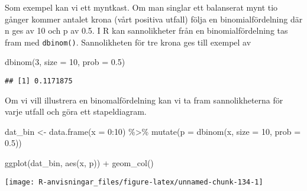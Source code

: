 \documentclass[
]{book}
\newenvironment{Shaded}{\begin{snugshade}}{\end{snugshade}}
\newcommand{\AttributeTok}[1]{\textcolor[rgb]{0.77,0.63,0.00}{#1}}
\newcommand{\DecValTok}[1]{\textcolor[rgb]{0.00,0.00,0.81}{#1}}
\newcommand{\FloatTok}[1]{\textcolor[rgb]{0.00,0.00,0.81}{#1}}
\newcommand{\FunctionTok}[1]{\textcolor[rgb]{0.00,0.00,0.00}{#1}}
\newcommand{\NormalTok}[1]{#1}
\newcommand{\OtherTok}[1]{\textcolor[rgb]{0.56,0.35,0.01}{#1}}
\newcommand{\SpecialCharTok}[1]{\textcolor[rgb]{0.00,0.00,0.00}{#1}}
\theoremstyle{definition}
\theoremstyle{definition}
\theoremstyle{definition}
\theoremstyle{definition}
\theoremstyle{remark}
\begin{document}
Som exempel kan vi ett myntkast. Om man singlar ett balanserat mynt tio gånger kommer antalet krona (vårt positiva utfall) följa en binomialfördelning där n ges av 10 och p av 0.5. I R kan sannolikheter från en binomialfördelning tas fram med \texttt{dbinom()}. Sannolikheten för tre krona ges till exempel av

\begin{Shaded}
\begin{Highlighting}[]
\FunctionTok{dbinom}\NormalTok{(}\DecValTok{3}\NormalTok{, }\AttributeTok{size =} \DecValTok{10}\NormalTok{, }\AttributeTok{prob =} \FloatTok{0.5}\NormalTok{)}
\end{Highlighting}
\end{Shaded}

\begin{verbatim}
## [1] 0.1171875
\end{verbatim}

Om vi vill illustrera en binomalfördelning kan vi ta fram sannolikheterna för varje utfall och göra ett stapeldiagram.

\begin{Shaded}
\begin{Highlighting}[]
\NormalTok{dat\_bin }\OtherTok{\textless{}{-}} \FunctionTok{data.frame}\NormalTok{(}\AttributeTok{x =} \DecValTok{0}\SpecialCharTok{:}\DecValTok{10}\NormalTok{) }\SpecialCharTok{\%\textgreater{}\%} 
  \FunctionTok{mutate}\NormalTok{(}\AttributeTok{p =} \FunctionTok{dbinom}\NormalTok{(x, }\AttributeTok{size =} \DecValTok{10}\NormalTok{, }\AttributeTok{prob =} \FloatTok{0.5}\NormalTok{))}

\FunctionTok{ggplot}\NormalTok{(dat\_bin, }\FunctionTok{aes}\NormalTok{(x, p)) }\SpecialCharTok{+} \FunctionTok{geom\_col}\NormalTok{()}
\end{Highlighting}
\end{Shaded}

\begin{center}\texttt{[image: R-anvisningar\_files/figure-latex/unnamed-chunk-134-1]} \end{center}
\end{document}
